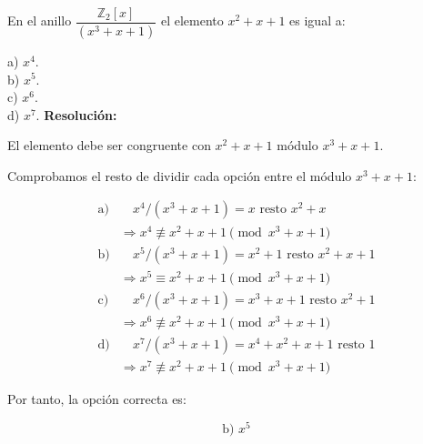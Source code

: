 \documentclass[a4paper,12pt]{article}
\begin{document}
\begin{ejercicio}[title=Ejercicio 55]
En el anillo $\dfrac{\mathbb{Z}_2[x]}{(x^3 + x + 1)}$ el elemento $x^2 + x + 1$ es igual a:

a) $x^4$. \\
b) $x^5$. \\
c) $x^6$. \\
d) $x^7$.
\tcblower
\textbf{Resolución:}

El elemento debe ser congruente con $x^2 + x + 1$ módulo $x^3 + x + 1$.

Comprobamos el resto de dividir cada opción entre el módulo $x^3 + x + 1$:

\[
\begin{aligned}
\text{a)} &\quad x^4 / (x^3 + x + 1) = x \text{ resto } x^2 + x \\
&\Rightarrow x^4 \not\equiv x^2 + x + 1 \pmod{x^3 + x + 1} \\[6pt]
\text{b)} &\quad x^5 / (x^3 + x + 1) = x^2 + 1 \text{ resto } x^2 + x + 1 \\
&\Rightarrow x^5 \equiv x^2 + x + 1 \pmod{x^3 + x + 1} \\[6pt]
\text{c)} &\quad x^6 / (x^3 + x + 1) = x^3 + x + 1 \text{ resto } x^2 + 1 \\
&\Rightarrow x^6 \not\equiv x^2 + x + 1 \pmod{x^3 + x + 1} \\[6pt]
\text{d)} &\quad x^7 / (x^3 + x + 1) = x^4 + x^2 + x + 1 \text{ resto } 1 \\
&\Rightarrow x^7 \not\equiv x^2 + x + 1 \pmod{x^3 + x + 1}
\end{aligned}
\]

Por tanto, la opción correcta es:

\[
\boxed{\text{b) } x^5}
\]
\end{ejercicio}
\end{document}
